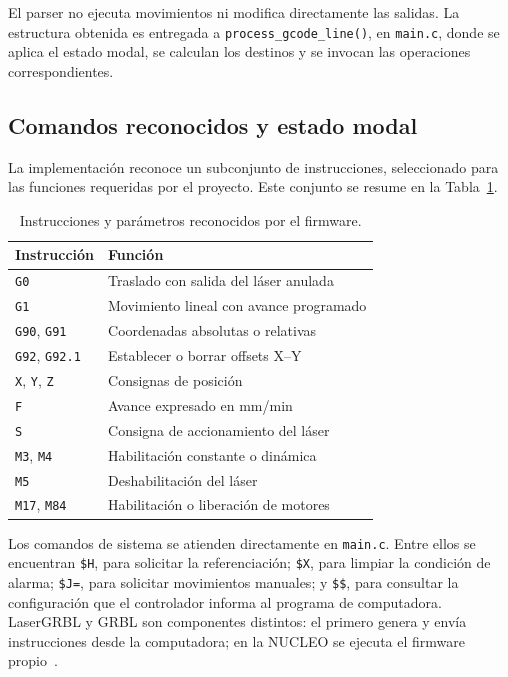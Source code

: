 \documentclass[blue,fullpaper]{ludusofficial}  %
\begin{document}
El parser no ejecuta movimientos ni modifica directamente
las salidas. La estructura obtenida es entregada a
\texttt{process\_gcode\_line()}, en \texttt{main.c},
donde se aplica el estado modal, se calculan los destinos
y se invocan las operaciones correspondientes.

\subsection{Comandos reconocidos y estado modal}

La implementación reconoce un subconjunto de instrucciones,
seleccionado para las funciones requeridas por el proyecto.
Este conjunto se resume en la Tabla~\ref{tab:gcode-admitido}.

\begin{table}[htbp]
    \centering
    \small
    \caption{Instrucciones y parámetros reconocidos
    por el firmware.}
    \label{tab:gcode-admitido}
    \begin{tabular}{ll}
        \hline
        Instrucción & Función \\
        \hline
        \texttt{G0} & Traslado con salida del láser anulada \\
        \texttt{G1} & Movimiento lineal con avance programado \\
        \texttt{G90}, \texttt{G91} & Coordenadas absolutas o relativas \\
        \texttt{G92}, \texttt{G92.1} & Establecer o borrar offsets X--Y \\
        \texttt{X}, \texttt{Y}, \texttt{Z} & Consignas de posición \\
        \texttt{F} & Avance expresado en mm/min \\
        \texttt{S} & Consigna de accionamiento del láser \\
        \texttt{M3}, \texttt{M4} & Habilitación constante o dinámica \\
        \texttt{M5} & Deshabilitación del láser \\
        \texttt{M17}, \texttt{M84} & Habilitación o liberación de motores \\
        \hline
    \end{tabular}
\end{table}

Los comandos de sistema se atienden directamente
en \texttt{main.c}. Entre ellos se encuentran
\texttt{\$H}, para solicitar la referenciación;
\texttt{\$X}, para limpiar la condición de alarma;
\texttt{\$J=}, para solicitar movimientos manuales;
y \texttt{\$\$}, para consultar la configuración
que el controlador informa al programa de computadora. LaserGRBL y GRBL son componentes distintos: el primero genera y envía instrucciones desde la computadora; en la NUCLEO se ejecuta el firmware propio~\cite{lasergrbl_config}.
\end{document}
